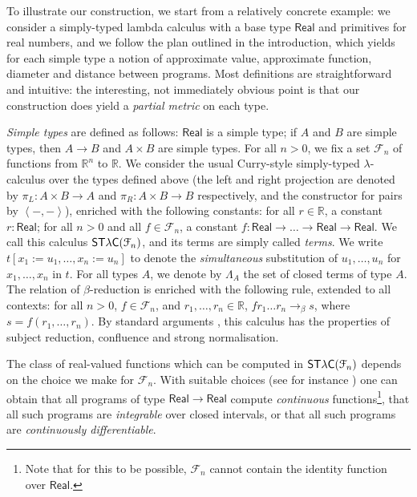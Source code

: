
To illustrate our construction, we start from a relatively concrete example: we consider a simply-typed lambda calculus with a base type $\mathsf{Real}$ and primitives for real numbers, and we follow the plan outlined in the introduction, which yields for each simple type a notion of approximate value, approximate function, diameter and distance between programs. Most definitions are straightforward and intuitive: the interesting, not immediately obvious point is that our construction does yield a \emph{partial metric} on each type.

\emph{Simple types} are defined as follows: $\mathsf{Real}$ is a simple type; if $A$ and $B$ are simple types, then $A \to B$ and $A \times B$ are simple types.
For all $n>0$, we fix a set $\mathcal{F}_n$ of functions from $\mathbb{R}^n$ to $\mathbb{R}$. We consider the usual Curry-style simply-typed $\lambda$-calculus over the types defined above (the left and right projection are denoted by $\pi_L:A\times B \to A$ and  $\pi_R:A\times B \to B$ respectively, and the constructor for pairs by $\left\langle-,-\right\rangle$), enriched with the following constants: for all $r \in \mathbb{R}$, a constant $r:\mathsf{Real}$; for all $n>0$ and all $f\in\mathcal{F}_n$, a constant $f:\mathsf{Real}\to\ldots\to\mathsf{Real}\to\mathsf{Real}$. We call this calculus $\mathsf{ST\lambda C}(\mathcal F_{n})$, and its terms are simply called \emph{terms}. We write $t[x_1 := u_1, \ldots, x_n := u_n]$ to denote the \emph{simultaneous} substitution of $u_1, \ldots, u_n$ for $x_1, \ldots, x_n$ in $t$. For all types $A$, we denote by $\Lambda_A$ the set of closed terms of type $A$. The relation of $\beta$-reduction is enriched with the following rule, extended to all contexts: for all $n>0$, $f\in\mathcal{F}_n$, and $r_1,\ldots,r_n\in\mathbb{R}$, $f r_1 \ldots r_n \to_\beta s$, where $s = f(r_1, \ldots, r_n)$. By standard arguments \cite{abramsky:handbook-2}, this calculus has the properties of subject reduction, confluence and strong normalisation.

\begin{remark}\label{rem:continuous}
The class of real-valued functions which can be computed in $\mathsf{ST\lambda C}(\mathcal F_{n})$ depends on the choice we make for $\mathcal F_{n}$. With suitable choices (see for instance \cite{TaylorReal, Di-Gianantonio:2013aa,Edalat:2000aa}) one can obtain that all programs of type $\mathsf{Real}\to \mathsf{Real}$ compute \emph{continuous} functions\footnote{Note that for this to be possible, $\mathcal F_{n}$ cannot contain the identity function over $\mathsf{Real}$.}, that all such programs are \emph{integrable} over closed intervals, or that all such programs are \emph{continuously differentiable}.



\end{remark}

